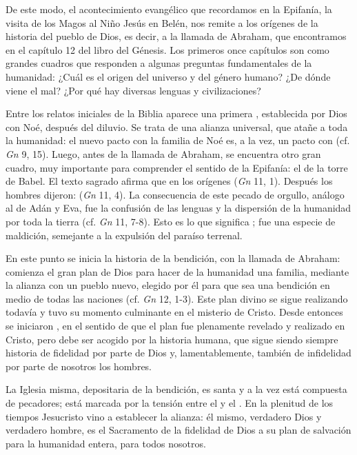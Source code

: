 \begin{body}
					De este modo, el acontecimiento evangélico que recordamos en la Epifanía, la visita de los Magos al Niño Jesús en Belén, nos remite a los orígenes de la historia del pueblo de Dios, es decir, a la llamada de Abraham, que encontramos en el capítulo 12 del libro del Génesis. Los primeros once capítulos son como grandes cuadros que responden a algunas preguntas fundamentales de la humanidad: ¿Cuál es el origen del universo y del género humano? ¿De dónde viene el mal? ¿Por qué hay diversas lenguas y civilizaciones?
					
					Entre los relatos iniciales de la Biblia aparece una primera , establecida por Dios con Noé, después del diluvio. Se trata de una alianza universal, que atañe a toda la humanidad: el nuevo pacto con la familia de Noé es, a la vez, un pacto con  (cf. \emph{Gn} 9, 15). Luego, antes de la llamada de Abraham, se encuentra otro gran cuadro, muy importante para comprender el sentido de la Epifanía: el de la torre de Babel. El texto sagrado afirma que en los orígenes  (\emph{Gn} 11, 1). Después los hombres dijeron:  (\emph{Gn} 11, 4). La consecuencia de este pecado de orgullo, análogo al de Adán y Eva, fue la confusión de las lenguas y la dispersión de la humanidad por toda la tierra (cf. \emph{Gn} 11, 7-8). Esto es lo que significa ; fue una especie de maldición, semejante a la expulsión del paraíso terrenal.
					
					En este punto se inicia la historia de la bendición, con la llamada de Abraham: comienza el gran plan de Dios para hacer de la humanidad una familia, mediante la alianza con un pueblo nuevo, elegido por él para que sea una bendición en medio de todas las naciones (cf. \emph{Gn} 12, 1-3). Este plan divino se sigue realizando todavía y tuvo su momento culminante en el misterio de Cristo. Desde entonces se iniciaron , en el sentido de que el plan fue plenamente revelado y realizado en Cristo, pero debe ser acogido por la historia humana, que sigue siendo siempre historia de fidelidad por parte de Dios y, lamentablemente, también de infidelidad por parte de nosotros los hombres.
					
					La Iglesia misma, depositaria de la bendición, es santa y a la vez está compuesta de pecadores; está marcada por la tensión entre el  y el . En la plenitud de los tiempos Jesucristo vino a establecer la alianza: él mismo, verdadero Dios y verdadero hombre, es el Sacramento de la fidelidad de Dios a su plan de salvación para la humanidad entera, para todos nosotros.
					

\end{body}
